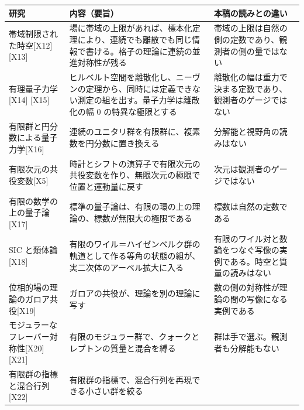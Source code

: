 \documentclass[
  a4paper,
]{ltjsarticle}
\newcounter{none} %
\begin{document}
{\def\LTcaptype{none} %
\begin{longtable}[]{@{}
  >{\raggedright\arraybackslash}p{}
  >{\raggedright\arraybackslash}p{}
  >{\raggedright\arraybackslash}p{}@{}}
\toprule\noalign{}
\begin{minipage}[b]{\linewidth}\raggedright
研究
\end{minipage} & \begin{minipage}[b]{\linewidth}\raggedright
内容（要旨）
\end{minipage} & \begin{minipage}[b]{\linewidth}\raggedright
本稿の読みとの違い
\end{minipage} \\
\midrule\noalign{}
\endhead
\bottomrule\noalign{}
\endlastfoot
帯域制限された時空{[}X12{]} {[}X13{]} &
場に帯域の上限があれば、標本化定理により、連続でも離散でも同じ情報で書ける。格子の理論に連続の並進対称性が残る
& 帯域の上限は自然の側の定数であり、観測者の側の量ではない \\
有理量子力学{[}X14{]} {[}X15{]} &
ヒルベルト空間を離散化し、ニーヴンの定理から、同時には定義できない測定の組を出す。量子力学は離散化の幅
0 の特異な極限とする &
離散化の幅は重力で決まる定数であり、観測者のゲージではない \\
有限群と円分数による量子力学{[}X16{]} &
連続のユニタリ群を有限群に、複素数を円分数に置き換える &
分解能と視野角の読みはない \\
有限次元の共役変数{[}X5{]} &
時計とシフトの演算子で有限次元の共役変数を作り、無限次元の極限で位置と運動量に戻す
& 次元は観測者のゲージではない \\
有限の数学の上の量子論{[}X17{]} &
標準の量子論は、有限の環の上の理論の、標数が無限大の極限である &
標数は自然の定数である \\
SIC と類体論{[}X18{]} &
有限のワイル＝ハイゼンベルク群の軌道として作る等角の状態の組が、実二次体のアーベル拡大に入る
&
有限のワイル対と数論をつなぐ写像の実例である。時空と質量の読みはない \\
位相的場の理論のガロア共役{[}X19{]} &
ガロアの共役が、理論を別の理論に写す &
数の側の対称性が理論の間の写像になる実例である \\
モジュラーなフレーバー対称性{[}X20{]} {[}X21{]} &
有限のモジュラー群で、クォークとレプトンの質量と混合を縛る &
群は手で選ぶ。観測者も分解能もない \\
有限群の指標と混合行列{[}X22{]} &
有限群の指標で、混合行列を再現できる小さい群を絞る &

\end{longtable}}
\end{document}
